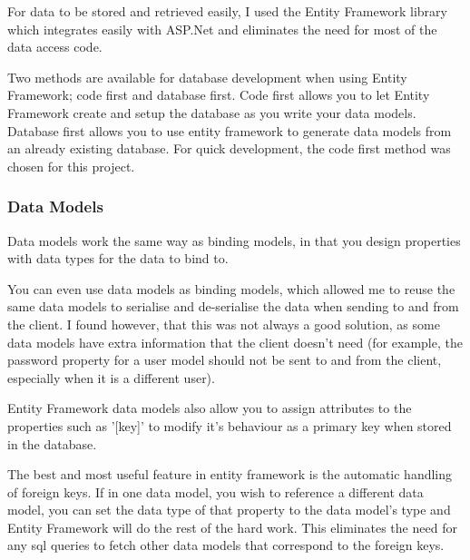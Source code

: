 For data to be stored and retrieved easily, I used the Entity Framework library which integrates easily with ASP.Net and eliminates the need for most of the data access code. 

Two methods are available for database development when using Entity Framework; code first and database first. Code first allows you to let Entity Framework create and setup the database as you write your data models. Database first allows you to use entity framework to generate data models from an already existing database. For quick development, the code first method was chosen for this project.

\subsubsection{Data Models}

Data models work the same way as binding models, in that you design properties with data types for the data to bind to.

You can even use data models as binding models, which allowed me to reuse the same data models to serialise and de-serialise the data when sending to and from the client. I found however, that this was not always a good solution, as some data models have extra information that the client doesn't need (for example, the password property for a user model should not be sent to and from the client, especially when it is a different user).

Entity Framework data models also allow you to assign attributes to the properties such as '[key]' to modify it's behaviour as a primary key when stored in the database.

The best and most useful feature in entity framework is the automatic handling of foreign keys. If in one data model, you wish to reference a different data model, you can set the data type of that property to the data model's type and Entity Framework will do the rest of the hard work. This eliminates the need for any sql queries to fetch other data models that correspond to the foreign keys.

